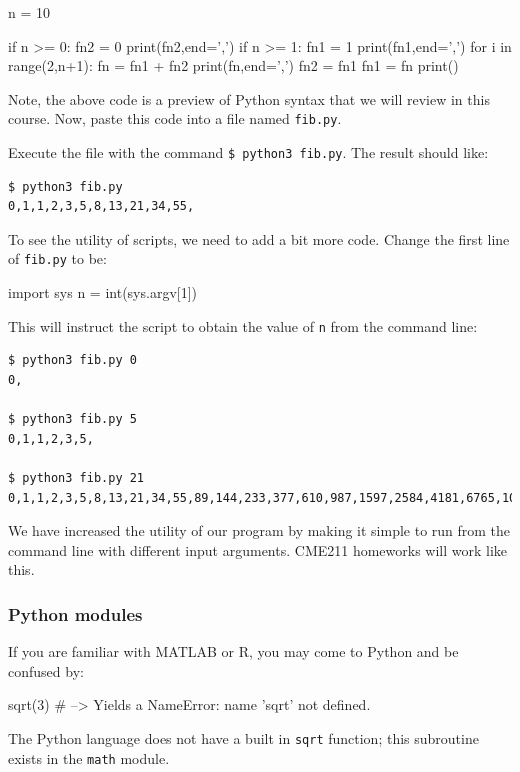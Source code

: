 \documentclass[12pt,letterpaper,twoside]{article}
\begin{document}
\begin{python}
n = 10

if n >= 0:
    fn2 = 0
    print(fn2,end=',')
if n >= 1:
    fn1 = 1
    print(fn1,end=',')
for i in range(2,n+1):
    fn = fn1 + fn2
    print(fn,end=',')
    fn2 = fn1
    fn1 = fn
print()
\end{python}

Note, the above code is a preview of Python syntax that we will review
in this course. Now, paste this code into a file named \texttt{fib.py}.

Execute the file with the command \newline 
\texttt{\$\ python3\ fib.py}. The result should like:

\begin{lstlisting}[language=bash]
$ python3 fib.py
0,1,1,2,3,5,8,13,21,34,55,
\end{lstlisting}

To see the utility of scripts, we need to add a bit more code. Change
the first line of \texttt{fib.py} to be:

\begin{python}
import sys
n = int(sys.argv[1])
\end{python}

This will instruct the script to obtain the value of \texttt{n} from the
command line:

\begin{lstlisting}[language=bash]
$ python3 fib.py 0
0,

$ python3 fib.py 5
0,1,1,2,3,5,

$ python3 fib.py 21
0,1,1,2,3,5,8,13,21,34,55,89,144,233,377,610,987,1597,2584,4181,6765,10946,
\end{lstlisting}

We have increased the utility of our program by making it simple to run
from the command line with different input arguments. CME211 homeworks
will work like this.

\subsubsection{Python modules}
If you are familiar with MATLAB or R, you may come to Python and be confused
by:

\begin{python}
sqrt(3)  # --> Yields a NameError: name 'sqrt' not defined.
\end{python}

The Python language does not have a built in \texttt{sqrt} function;
this subroutine exists in the \texttt{math} module.
\end{document}
